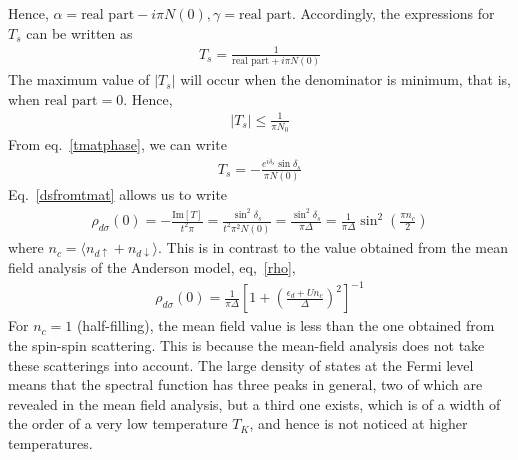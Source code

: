 \documentclass[twoside]{report}
\numberwithin{equation}{section}
\begin{document}
Hence, \(\alpha = \text{real part} - i\pi N(0), \gamma =\text{real part}\).
Accordingly, the expressions for \(T_s\) can be written as
\begin{equation}\begin{aligned}
T_s = \frac{1}{\text{real part} + i \pi N(0)}
\end{aligned}\end{equation}
The maximum value of \(|T_s|\) will occur when the denominator is minimum, that is, when \(\text{real part} = 0\).
Hence,
\begin{equation}\begin{aligned}
|T_s| \leq \frac{1}{\pi N_0}
\end{aligned}\end{equation}
From eq.~\ref{tmatphase}, we can write
\begin{equation}\begin{aligned}
T_s = -\frac{e^{i \delta_s}\sin \delta_s}{\pi N(0)}
\end{aligned}\end{equation}
Eq.~\ref{dsfromtmat} allows us to write
\begin{equation}\begin{aligned}
	\rho_{d\sigma}(0) = -\frac{\text{Im}[T]}{t^2 \pi} = \frac{\sin^2 \delta_s}{t^2 \pi^2 N(0)} = \frac{\sin^2 \delta_s}{\pi \Delta} = \frac{1}{\pi \Delta}\sin^2 \left(\frac{\pi n_c}{2}\right)
\end{aligned}\end{equation}
where \(n_c = \langle  n_{d\uparrow}+n_{d\downarrow}\rangle\).
This is in contrast to the value obtained from the mean field analysis of the Anderson model, eq,~\ref{rho},
\begin{equation}\begin{aligned}
	\rho_{d\sigma}(0) = \frac{1}{\pi \Delta}\left[1 + \left(\frac{\epsilon_d + Un_c}{\Delta}\right)^{2}\right]^{-1}
\end{aligned}\end{equation}
For \(n_c =1\) (half-filling), the mean field value is less than the one obtained from the spin-spin scattering.
This is because the mean-field analysis does not take these scatterings into account.
The large density of states at the Fermi level means that the spectral function has three peaks in general, two of which are revealed in the mean field analysis, but a third one exists, which is of a width of the order of a very low temperature \(T_K\), and hence is not noticed at higher temperatures.\\\\
\end{document}
